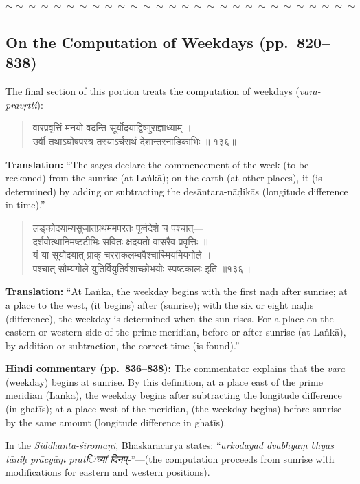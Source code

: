 \documentclass[11pt,a4paper]{article}
\newcommand{\dev}[1]{{\devanagarifont #1}}
\newenvironment{shloka}
  {\begin{verse}\devanagarifont\color{versecolor}}
  {\end{verse}}
\newenvironment{commentary}
  {\small\color{commentarycolor}\par\noindent\ignorespaces}
  {\par}
\newcommand{\wavydivider}{\begin{center}$\sim\sim\sim\sim\sim\sim\sim\sim\sim\sim\sim\sim\sim\sim\sim\sim\sim\sim\sim\sim\sim\sim\sim\sim\sim\sim\sim\sim$\end{center}}
\begin{document}
\wavydivider

\subsection*{On the Computation of Weekdays (pp.\ 820--838)}

The final section of this portion treats the computation of weekdays (\textit{vāra-pravṛtti}):

\begin{shloka}
\dev{वारप्रवृत्तिं मनयो वदन्ति सूर्योदयाद्विष्णुराज्ञाध्याम् ।}\\
\dev{उर्वी तथाऽघोषपरत्र तस्याऽर्चराथं देशान्तरनाडिकाभिः ॥ १३६॥}
\end{shloka}

\textbf{Translation:} ``The sages declare the commencement of the week (to be reckoned) from the sunrise (at Laṅkā); on the earth (at other places), it (is determined) by adding or subtracting the desāntara-nāḍikās (longitude difference in time).''

\begin{shloka}
\dev{लङ्कोदयाम्यसुजातप्रथममपरतः पूर्व्वदेशे च पश्चात्—}\\
\dev{दर्शवोत्थानिमष्टटीभिः सवितः क्षदयतो वासरैव प्रवृत्तिः ॥}\\
\dev{यं या सूर्योदयात् प्राक् चरराकलम्बवैश्चास्मियमियगोले ।}\\
\dev{पश्चात् सौम्यगोले युतिर्वियुतिर्वशाच्छोभयोः स्पष्टकालः इति ॥१३६॥}
\end{shloka}

\textbf{Translation:} ``At Laṅkā, the weekday begins with the first nāḍī after sunrise; at a place to the west, (it begins) after (sunrise); with the six or eight nāḍīs (difference), the weekday is determined when the sun rises. For a place on the eastern or western side of the prime meridian, before or after sunrise (at Laṅkā), by addition or subtraction, the correct time (is found).''

\begin{commentary}
\textbf{Hindi commentary (pp.\ 836--838):} The commentator explains that the \textit{vāra} (weekday) begins at sunrise. By this definition, at a place east of the prime meridian (Laṅkā), the weekday begins after subtracting the longitude difference (in ghatīs); at a place west of the meridian, (the weekday begins) before sunrise by the same amount (longitude difference in ghatīs).

In the \textit{Siddhānta-śiromaṇi}, Bhāskarācārya states: ``\textit{arkodayād dvābhyāṃ bhyas tāniḥ prācyāṃ pratिच्यां दिनप्-}''---(the computation proceeds from sunrise with modifications for eastern and western positions).
\end{commentary}
\end{document}
